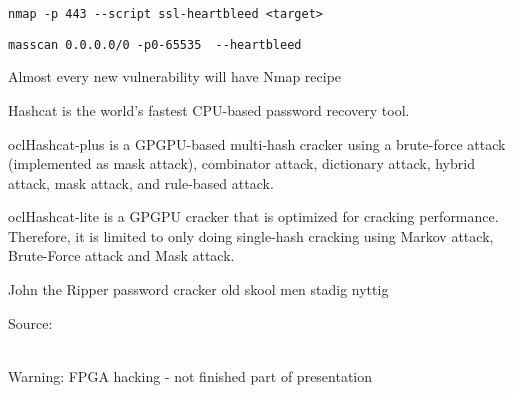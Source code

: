 \documentclass[20pt,landscape,a4paper,footrule]{foils}
\begin{document}




\begin{list1}
\item \verb+nmap -p 443 --script ssl-heartbleed <target>+\\
\item \verb+masscan 0.0.0.0/0 -p0-65535  --heartbleed+\\
\end{list1}

\centerline{Almost every new vulnerability will have Nmap recipe}




\begin{list2}
\item Hashcat is the world's fastest CPU-based password recovery tool.
\item oclHashcat-plus is a GPGPU-based multi-hash cracker using a brute-force attack (implemented as mask attack), combinator attack, dictionary attack, hybrid attack, mask attack, and rule-based attack.
\item oclHashcat-lite is a GPGPU cracker that is optimized for cracking performance. Therefore, it is limited to only doing single-hash cracking using Markov attack, Brute-Force attack and Mask attack.
\item John the Ripper password cracker old skool men stadig nyttig
\end{list2}

Source:\\
\\




Warning: FPGA hacking - not finished part of presentation


\end{document}
